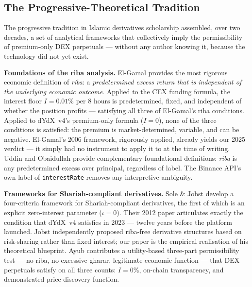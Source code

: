 \documentclass[10pt,twocolumn]{article}
\begin{document}
\subsection{The Progressive-Theoretical Tradition}

The progressive tradition in Islamic derivatives scholarship assembled, over
two decades, a set of analytical frameworks that collectively imply the
permissibility of premium-only DEX perpetuals --- without any author knowing
it, because the technology did not yet exist.

\textbf{Foundations of the riba analysis.}
El-Gamal \cite{ElGamal2006} provides the most rigorous economic definition of
\textit{riba}: a \emph{predetermined excess return that is independent of the
underlying economic outcome}.
Applied to the CEX funding formula, the interest floor $I = 0.01\%$ per 8 hours
is predetermined, fixed, and independent of whether the position profits ---
satisfying all three of El-Gamal's riba conditions.
Applied to dYdX~v4's premium-only formula ($I = 0$), none of the three
conditions is satisfied: the premium is market-determined, variable, and
can be negative.
El-Gamal's 2006 framework, rigorously applied, already yields our 2025 verdict ---
it simply had no instrument to apply it to at the time of writing.
Uddin \cite{Uddin2015} and Obaidullah \cite{Obaidullah2005} provide complementary
foundational definitions: \textit{riba} is any predetermined excess over principal,
regardless of label. The Binance API's own label of \texttt{interestRate} removes
any interpretive ambiguity.

\textbf{Frameworks for Shariah-compliant derivatives.}
Sole \& Jobst \cite{SoleJobst2012} develop a four-criteria framework for
Shariah-compliant derivatives, the first of which is an explicit zero-interest
parameter ($\iota = 0$).
Their 2012 paper articulates exactly the condition that dYdX~v4 satisfies in 2023
--- twelve years before the platform launched.
Jobst \cite{Jobst2007} independently proposed riba-free derivative structures based
on risk-sharing rather than fixed interest; our paper is the empirical
realisation of his theoretical blueprint.
Ayub \cite{Ayub2007} contributes a utility-based three-part permissibility test ---
no riba, no excessive gharar, legitimate economic function --- that DEX perpetuals
satisfy on all three counts: $I = 0\%$, on-chain transparency, and demonstrated
price-discovery function.
\end{document}
